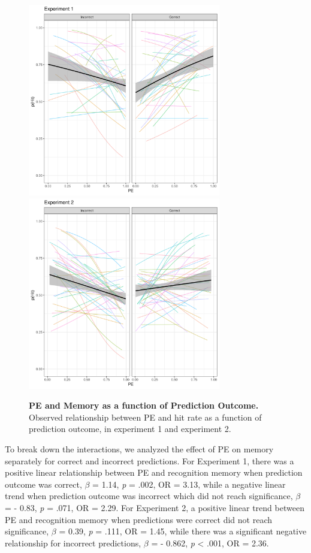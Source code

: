 \documentclass[a4paper,12pt]{article} 			%
\begin{document}
\begin{figure}
{\includegraphics[width=0.75\textwidth]{figures/PE_mem_fLR_instr.exp1.png}}\hfill
{\includegraphics[width=0.75\textwidth]{figures/PE_mem_fLR_instr.exp2.png}}\
\caption{\textbf{PE and Memory as a function of Prediction Outcome.} Observed relationship between PE and hit rate as a function of prediction outcome, in experiment 1 and experiment 2. }
\label{fig:PE_mem}

\end{figure}


To break down the interactions, we analyzed the effect of PE on memory separately for correct and incorrect predictions. For Experiment 1, there was a positive linear relationship between PE and recognition memory when prediction outcome was correct, $\beta$ = 1.14, \textit{p} = .002, OR = 3.13, while a negative linear trend when prediction outcome was incorrect which did not reach significance, $\beta$ = - 0.83, \textit{p} = .071, OR = 2.29. For Experiment 2, a positive linear trend between PE and recognition memory when predictions were correct did not reach significance, $\beta$ = 0.39, \textit{p} = .111, OR = 1.45, while there was a significant negative relationship for incorrect predictions, $\beta$ = - 0.862, \textit{p} < .001, OR = 2.36. 
\end{document}
